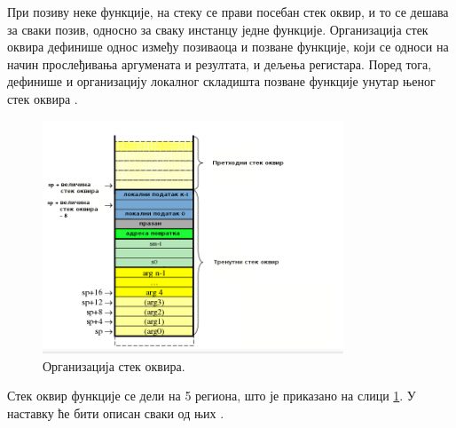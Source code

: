 \documentclass[12pt,oneside]{memoir}
\begin{document}
При позиву неке функције, на стеку се прави посебан стек оквир, и то се дешава за сваки позив, односно за сваку инстанцу једне функције. Организација стек оквира дефинише однос између позиваоца и позване функције, који се односи на начин прослеђивања аргумената и резултата, и дељења регистара. Поред тога, дефинише и организацију локалног складишта позване функције унутар њеног стек оквира \cite{konvencija}.

\begin{figure}[!ht]
  \centering
  \includegraphics[width=0.8\textwidth]{stack_frame.png}
  \caption{Организација стек оквира.}
  \label{fig:stack_frame}
\end{figure}

Стек оквир функције се дели на 5 региона, што је приказано на слици \ref{fig:stack_frame}. У наставку ће бити описан сваки од њих \cite{konvencija}.
\end{document}
